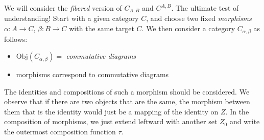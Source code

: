 \documentclass{report}
\begin{document}
\begin{examples}
    \begin{example}[\label{exm:1.3.10}]
        We will consider the \textit{fibered} version of $C_{A, B}$ and $C^{A, B}$. The ultimate test of understanding! Start with a given category $C$, and choose two fixed \textit{morphisms} $\alpha : A \rightarrow C$, $\beta : B \rightarrow C$ with the same target $C$. We then consider a category $C_{\alpha, \beta}$ as follows:
            \begin{itemize}
                \item $\text{Obj}(C_{\alpha,\beta}) = $ \textit{commutative diagrams}
                    \begin{center}
                    \end{center}

                \item morphisms correspond to commutative diagrams
                    \begin{center}
                    \end{center}
            \end{itemize}
        The identities and compositions of such a morphism should be considered. We observe that if there are two objects that are the same, the morphism between them that is the identity would just be a mapping of the identity on $Z$. In the composition of morphisms, we just extend leftward with another set $Z_{0}$ and write the outermost composition function $\tau$.


\end{example}
\end{examples}
\end{document}
